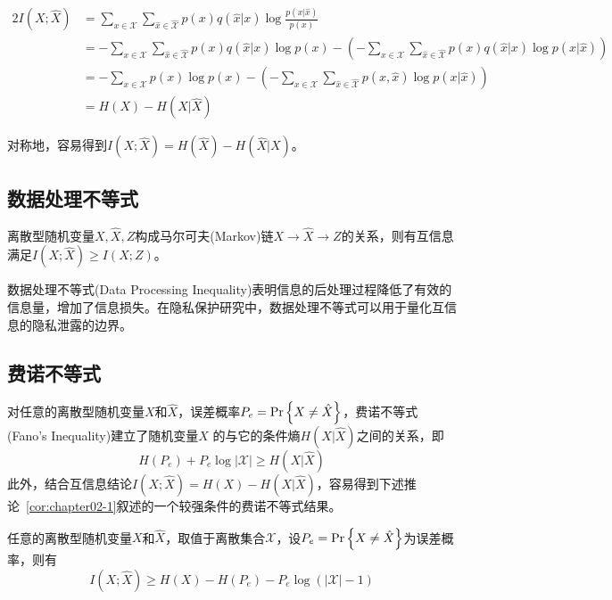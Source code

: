 \begin{alignat}{2}
		I(X;\hat{X}) & = \sum_{x\in\mathcal{X}}\sum_{\hat{x}\in \hat{\mathcal{X}}}p(x)q(\hat{x}|x)\log \frac{p(x|\hat{x})}{p(x)}\\
		& =  -\sum_{x\in\mathcal{X}}\sum_{\hat{x}\in \hat{\mathcal{X}}}p(x)q(\hat{x}|x) \log p(x)-\left( -\sum_{x\in\mathcal{X}}\sum_{\hat{x}\in \hat{\mathcal{X}}} p(x)q(\hat{x}|x) \log p(x|\hat{x})\right)\\
		& = -\sum_{x \in \mathcal{X}}p(x)\log p(x)-\left( -\sum_{x\in\mathcal{X}}\sum_{\hat{x}\in \hat{\mathcal{X}}}p(x,\hat{x})\log p(x|\hat{x})\right)\\
		& =H(X)-H(X|\hat{X})
\end{alignat}

对称地，容易得到$I(X;\hat{X})=H(\hat{X})-H(\hat{X}|X)$。
\subsection{数据处理不等式}
\begin{definition}\label{def:dataprocessinginequality}
	离散型随机变量$X,\hat{X},Z$构成马尔可夫(Markov)链$X \rightarrow \hat{X}\rightarrow Z$的关系，则有互信息满足$I(X;\hat{X})\geq I(X;Z)$。
\end{definition}
数据处理不等式(Data Processing Inequality)表明信息的后处理过程降低了有效的信息量，增加了信息损失。在隐私保护研究中，数据处理不等式可以用于量化互信息的隐私泄露的边界。
\subsection{费诺不等式}
对任意的离散型随机变量$X$和$\hat{X}$，误差概率$P_e={\rm Pr}\left\{X \neq \hat{X}\right\}$，费诺不等式(Fano's Inequality)建立了随机变量$X$ 的与它的条件熵$H(X|\hat{X})$之间的关系，即
\begin{equation}
	H(P_e)+P_e\log |\mathcal{X}| \geq H(X|\hat{X})
\end{equation}
此外，结合互信息结论$I(X;\hat{X})=H(X)-H(X|\hat{X})$，容易得到下述推论~\ref{cor:chapter02-1}叙述的一个较强条件的费诺不等式结果。
\begin{corollary}\label{cor:chapter02-1}任意的离散型随机变量$X$和$\hat{X}$，取值于离散集合$\mathcal{X}$，设$P_e={\rm Pr}\left\{X \neq \hat{X}\right\}$为误差概率，则有
	\begin{equation}
	I(X;\hat{X})\geq H(X)-H(P_e)-P_e\log (|\mathcal{X}|-1)
	\end{equation}
\end{corollary}


